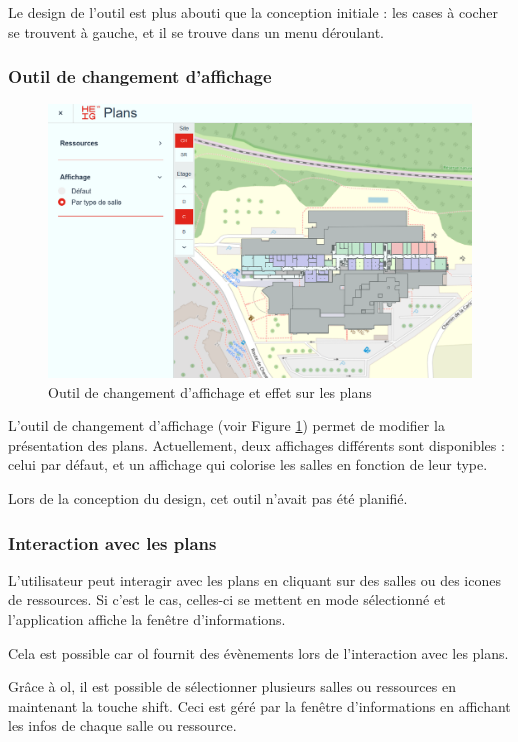 \documentclass[
    iai, %
    il, %
]{heig-tb}
\begin{document}
Le design de l'outil est plus abouti que la conception initiale : les cases à cocher se trouvent à gauche, et
il se trouve dans un menu déroulant.

\subsubsection{Outil de changement d'affichage}

\begin{figure}[h]
    \centering
    \includegraphics[scale=0.4]{frontend-affichageParType.png}
    \caption{Outil de changement d'affichage et effet sur les plans}
    \label{fig:affichage}
\end{figure}

L'outil de changement d'affichage (voir Figure \ref{fig:affichage}) permet de modifier la présentation des plans.
Actuellement, deux affichages différents sont disponibles :
celui par défaut, et un affichage qui colorise les salles en fonction de leur type.

Lors de la conception du design, cet outil n'avait pas été planifié.

\subsubsection{Interaction avec les plans}
L'utilisateur peut interagir avec les plans en cliquant sur des salles ou des icones de ressources.
Si c'est le cas, celles-ci se mettent en mode sélectionné et l'application affiche la fenêtre d'informations.

Cela est possible car \gls{ol} fournit des évènements lors de l'interaction avec les plans.

Grâce à \gls{ol}, il est possible de sélectionner plusieurs salles ou ressources en maintenant la touche shift.
Ceci est géré par la fenêtre d'informations en affichant les infos de chaque salle ou ressource.
\end{document}
